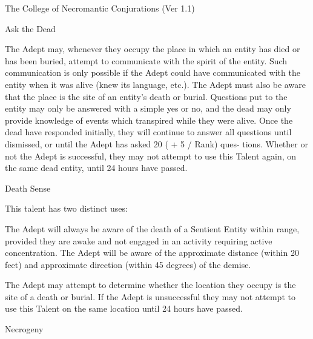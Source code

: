 \begin{Chapter}{The College of Necromantic Conjurations (Ver 1.1)}
\begin{talent}[T-1]{Ask the Dead}


\begin{effects}
The Adept may, whenever they occupy the place in which an entity has
died or has been buried, attempt to communicate with the spirit of the
entity.  Such communication is only possible if the Adept could have
communicated with the entity when it was alive (knew its language,
etc.).  The Adept must also be aware that the place is the site of an
entity’s death or burial. Questions put to the entity may only be
answered with a simple yes or no, and the dead may only provide
knowledge of events which transpired while they were alive.  Once the
dead have responded initially, they will continue to answer all
questions until dismissed, or until the Adept has asked 20 ( + 5 /
Rank) ques- tions. Whether or not the Adept is successful, they may
not attempt to use this Talent again, on the same dead entity, until
24 hours have passed.
\end{effects}
\end{talent}

\begin{talent}[T-2]{Death Sense}

\begin{effects}
This talent has two distinct uses: 
\begin{Enumerate}
\item The Adept will always be aware of the death of a Sentient Entity
  within range, provided they are awake and not engaged in an activity
  requiring active concentration.  The Adept will be aware of the
  approximate distance (within 20 feet) and approximate direction
  (within 45 degrees) of the demise.

\item The Adept may attempt to determine whether the location they
  occupy is the site of a death or burial.  If the Adept is
  unsuccessful they may not attempt to use this Talent on the same
  location until 24 hours have passed.
\end{Enumerate}
\end{effects}
\end{talent}

\begin{talent}[T-3]{Necrogeny}


\end{talent}
\end{Chapter}
